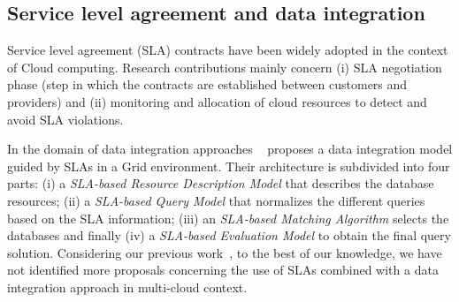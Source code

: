 \subsection{Service level agreement and data integration}
Service level agreement (SLA) contracts have been widely adopted in the context of Cloud computing. Research contributions mainly concern (i) SLA negotiation phase (step in which the
contracts are established between customers and providers) and (ii)
monitoring and allocation of cloud resources to detect and avoid SLA
violations.

In the domain of data integration approaches ~\cite{Nie07} proposes a data integration model guided by SLAs in a Grid environment.
Their architecture is subdivided into four parts: (i) a \textit{SLA-based
Resource Description Model} that describes the database resources; (ii)
a \textit{SLA-based Query Model} that normalizes the different queries based on the
SLA information; (iii) an \textit{SLA-based Matching Algorithm}  
selects the databases and finally (iv) a \textit{SLA-based Evaluation Model}
 to obtain the final query solution.
Considering our previous work~\cite{012}, to the best of our knowledge, we have
not identified more proposals concerning the use of SLAs combined with a data
integration approach in multi-cloud context.
